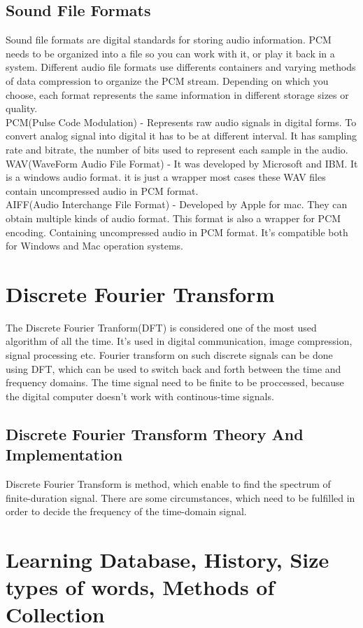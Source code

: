 \documentclass[english,12pt,oneside,a4paper]{article}
\begin{document}
\begin{center}
		\subsection{Sound File Formats}
		Sound file formats are digital standards for storing audio information. PCM needs to be organized into a file so you can work with it, or play it back in a system. Different audio file formats use differents containers and varying methods of data compression to organize the PCM stream. Depending on which you choose, each format represents the same information in different storage sizes or quality.\\
		PCM(Pulse Code Modulation) - Represents raw audio signals in digital forms. To convert analog signal into digital it has to be at different interval. It has sampling rate and bitrate, the number of bits used to represent each sample in the audio.\\
		WAV(WaveForm Audio File Format) - It was developed by Microsoft and IBM. It is a windows audio format. it is just a wrapper most cases these WAV files contain uncompressed audio in PCM format.\\
		AIFF(Audio Interchange File Format) - Developed by Apple for mac.
		They can obtain multiple kinds of audio format. This format is also a wrapper for PCM encoding. Containing uncompressed audio in PCM format. It's compatible both for Windows and Mac operation systems.
		
		\section{Discrete Fourier Transform}
		The Discrete Fourier Tranform(DFT) is considered one of the most used algorithm of all the time. It's used in digital communication, image compression, signal processing etc. Fourier transform on such discrete signals can be done using DFT, which can be used to switch back and forth between the time and frequency domains. The time signal need to be finite to be proccessed, because the digital computer doesn't work with continous-time signals.
		\subsection{Discrete Fourier Transform Theory And Implementation}
		Discrete Fourier Transform is method, which enable to find the spectrum of finite-duration signal. There are some circumstances, which need to be fulfilled in order to decide the frequency of the time-domain signal.
		\section{Learning Database, History, Size types of words, Methods of Collection}

\end{center}
\end{document}
